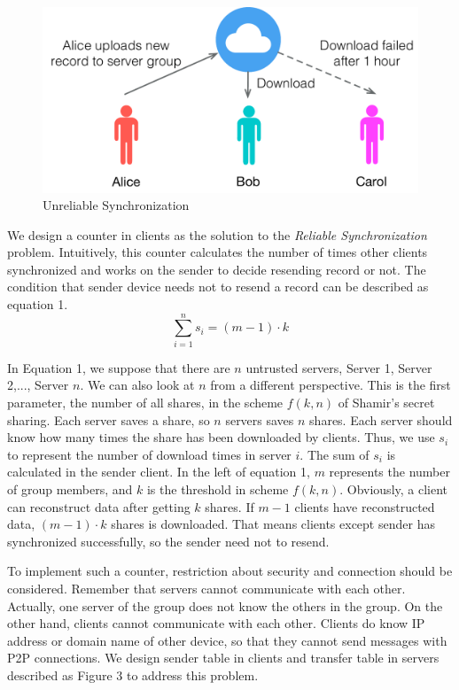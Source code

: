\documentclass[twocolumn,10pt]{article}
\begin{document}
\begin{figure}[t]
	\centering
	\includegraphics[scale=0.4]{unreliabe_sync}
	\caption{Unreliable Synchronization}
\end{figure}

We design a counter in clients as the solution to the \emph{Reliable Synchronization} problem. Intuitively, this counter calculates the number of times other clients synchronized and works on the sender to decide resending record or not. The condition that sender device needs not to resend a record can be described as equation 1.
\begin{equation}
\sum_{i=1}^{n}s_{i}=(m-1)\cdot k
\end{equation}

In Equation 1, we suppose that there are $n$ untrusted servers, Server 1, Server 2,..., Server $n$. We can also look at $n$ from a different perspective. This is the first parameter, the number of all shares, in the scheme $f(k, n)$ of Shamir's secret sharing. Each server saves a share, so $n$ servers saves $n$ shares. Each server should know how many times the share has been downloaded by clients. Thus, we use $s_i$ to represent the number of download times in server $i$. The sum of $s_i$ is calculated in the sender client. In the left of equation 1, $m$ represents the number of group members, and $k$ is the threshold in scheme $f(k, n)$. Obviously, a client can reconstruct data after getting $k$ shares. If $m-1$ clients have reconstructed data, $(m-1)\cdot k$ shares is downloaded. That means clients except sender has synchronized successfully, so the sender need not to resend.

To implement such a counter, restriction about security and connection should be considered. Remember that servers cannot communicate with each other. Actually, one server of the group does not know the others in the group. On the other hand, clients cannot communicate with each other. Clients do know IP address or domain name of other device, so that they cannot send messages with P2P connections. We design sender table in clients and transfer table in servers described as Figure 3 to address this problem. 
\end{document}
